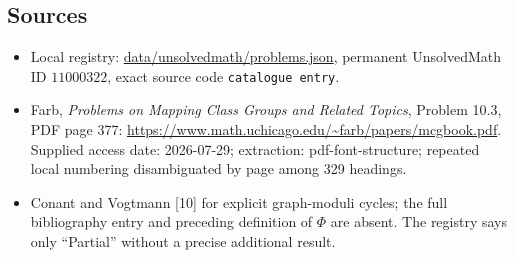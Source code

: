 \documentclass[11pt]{article}
\begin{document}
\subsection{Sources}
\begin{itemize}
\item Local registry: \url{data/unsolvedmath/problems.json}, permanent UnsolvedMath ID $11000322$, exact source code \texttt{catalogue entry}.
\item Farb, \emph{Problems on Mapping Class Groups and Related Topics}, Problem 10.3, PDF page 377: \url{https://www.math.uchicago.edu/~farb/papers/mcgbook.pdf}. Supplied access date: 2026-07-29; extraction: pdf-font-structure; repeated local numbering disambiguated by page among 329 headings.
\item Conant and Vogtmann [10] for explicit graph-moduli cycles; the full bibliography entry and preceding definition of $\Phi$ are absent. The registry says only ``Partial'' without a precise additional result.
\end{itemize}
\end{document}
